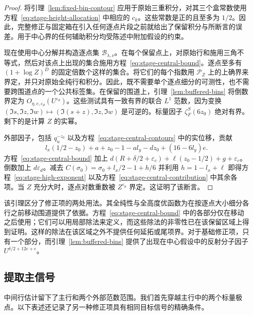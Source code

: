 \documentclass[11pt,a4paper]{article}
\numberwithin{equation}{section}
\numberwithin{figure}{section}
\theoremstyle{definition}
\theoremstyle{remark}
\begin{document}
\begin{proof}
将引理~\ref{lem:fixed-bin-contour} 应用于原始三重积分，对其三个盒常数使用方程~\eqref{eq:stage-height-allocation} 中相应的 $c_k$。这些常数是正的且至多为 $1/2$。因此，完整修正与固定箱在引入任何逐点片段之前就给出了保留积分与所断言的误差。用于中心界的任何辅助积分均受陈述中附加假设的约束。

现在使用中心分解并构造逐点集 $\mathcal B_{\lambda,\nu}$。在每个保留点上，对原始行和施用三角不等式，然后对该点上出现的集合施用方程~\eqref{eq:stage-central-bound}。逐点至多有 $(1+\log Z)^D$ 的固定倍数个这样的集合。将它们的每个指数用 $\mathcal P_Z$ 上的上确界来界定，并只对原始全纯行和积分。因此，既不需要单个逐点细分的可测性，也不需要跨围道点的一个公共标签集。在保留的围道上，引理~\ref{lem:buffered-bins} 将倒数界定为 $O_{\eta,e,\varepsilon_d}(U^{\varepsilon_d})$。这些测试具有一致有界的联合 $L^1$ 范数，因为变换 $(\Im s,\Im z,\Im w)\mapsto(\Im(s+z),\Im z,\Im w)$ 是可逆的。标量因子 $\zeta_F^S(6z_0)$ 绝对有界。剩下的是计算 $Z$ 的实幂。

外部因子，包括 $q_u^{-z_0}$ 以及方程~\eqref{eq:stage-central-contours} 中的实位移，贡献
\[
 l_x(1/2-z_0)+a+z_0-1-a l_y-dz_0+(16-6l_y)e.
\]
方程~\eqref{eq:stage-central-bound} 加上
$d(R+\delta/2+\varepsilon_c)+\ell(z_0-1/2)+g+\varepsilon_c$。
倒数加上 $d\varepsilon_d$。减去
$C(\sigma_0)=\sigma_0+l_x/2-1+h/6$ 并利用
$h=1-l_x+\ell$ 即得方程~\eqref{eq:stage-high-exponent} 以及方程~\eqref{eq:stage-central-contribution} 中其余各项。当 $Z$ 充分大时，逐点对数重数被 $Z^{\varepsilon_p}$ 界定。这证明了该断言。
\end{proof}该引理区分了修正项的两处用法。其全纯性与全高度优函数为在按逐点大小细分各行之前移动围道提供了依据。方程~\eqref{eq:stage-central-bound} 中的各部分仅在移动之后使用；它们可以用局部除法来定义，而这些除法的非零性已在该保留区域上得到证明。这样的除法在该区域之外不提供任何延拓或尾项界。对于基础修正项，只有一个部分，而引理~\ref{lem:buffered-bins} 提供了出现在中心假设中的反射分子因子 $U^{\delta/2+12e+\epsilon}$。

\subsection{提取主信号}

中间行估计留下了主行和两个外部范数范围。我们首先穿越主行中的两个标量极点。以下表述还记录了另一种修正项具有相同目标信号的精确条件。
\end{document}
